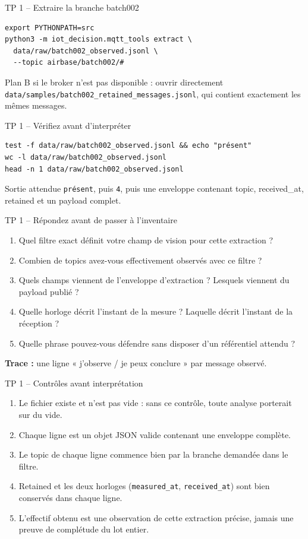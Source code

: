 \documentclass[aspectratio=169]{beamer}
\begin{document}
\begin{frame}[fragile]{TP 1 -- Extraire la branche batch002}
\small
\begin{verbatim}
export PYTHONPATH=src
python3 -m iot_decision.mqtt_tools extract \
  data/raw/batch002_observed.jsonl \
  --topic airbase/batch002/#
\end{verbatim}
Plan B si le broker n'est pas disponible : ouvrir directement \texttt{data/samples/batch002\_retained\_messages.jsonl}, qui contient exactement les mêmes messages.
\end{frame}

\begin{frame}[fragile]{TP 1 -- Vérifiez avant d'interpréter}
\small
\begin{verbatim}
test -f data/raw/batch002_observed.jsonl && echo "présent"
wc -l data/raw/batch002_observed.jsonl
head -n 1 data/raw/batch002_observed.jsonl
\end{verbatim}
\begin{block}{Sortie attendue}
\texttt{présent}, puis \texttt{4}, puis une enveloppe contenant topic, received\_at, retained et un payload complet.
\end{block}
\end{frame}

\begin{frame}{TP 1 -- Répondez avant de passer à l'inventaire}
\small
\begin{enumerate}
\item Quel filtre exact définit votre champ de vision pour cette extraction ?
\item Combien de topics avez-vous effectivement observés avec ce filtre ?
\item Quels champs viennent de l'enveloppe d'extraction ? Lesquels viennent du payload publié ?
\item Quelle horloge décrit l'instant de la mesure ? Laquelle décrit l'instant de la réception ?
\item Quelle phrase pouvez-vous défendre sans disposer d'un référentiel attendu ?
\end{enumerate}
\textbf{Trace :} une ligne « j'observe / je peux conclure » par message observé.
\end{frame}

\begin{frame}{TP 1 -- Contrôles avant interprétation}
\begin{enumerate}
\item Le fichier existe et n'est pas vide : sans ce contrôle, toute analyse porterait sur du vide.
\item Chaque ligne est un objet JSON valide contenant une enveloppe complète.
\item Le topic de chaque ligne commence bien par la branche demandée dans le filtre.
\item Retained et les deux horloges (\texttt{measured\_at}, \texttt{received\_at}) sont bien conservés dans chaque ligne.
\item L'effectif obtenu est une observation de cette extraction précise, jamais une preuve de complétude du lot entier.
\end{enumerate}
\end{frame}
\end{document}
